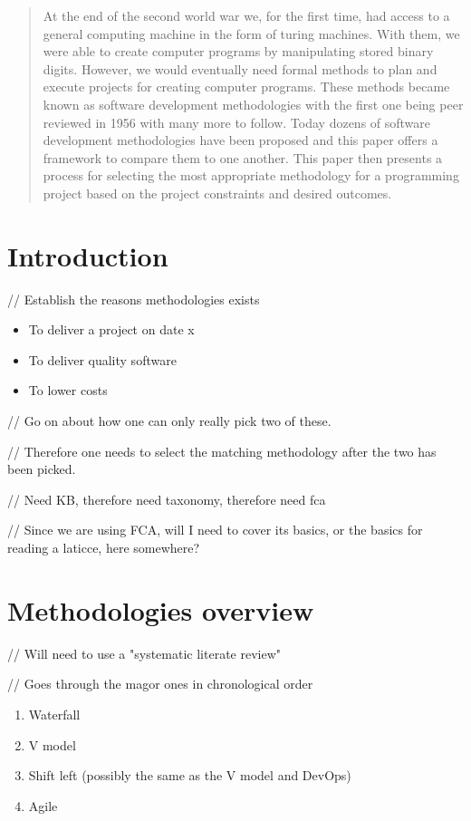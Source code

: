 \begin{abstract}
  At the end of the second world war we, for the first time, had access to a general computing machine in the form of turing machines.
  With them, we were able to create computer programs by manipulating stored binary digits.
  However, we would eventually need formal methods to plan and execute projects for creating computer programs.
  These methods became known as software development methodologies with the first one being peer reviewed in 1956 with many more to follow.
  Today dozens of software development methodologies have been proposed and this paper offers a framework to compare them to one another.
  This paper then presents a process for selecting the most appropriate methodology for a programming project based on the project constraints and desired outcomes.
\end{abstract}

\section{Introduction}
// Establish the reasons methodologies exists
\cite{einstein_1905}

\begin{itemize}
    \item To deliver a project on date x
    \item To deliver quality software
    \item To lower costs
\end{itemize}

// Go on about how one can only really pick two of these.

// Therefore one needs to select the matching methodology after the two has been picked.

// Need KB, therefore need taxonomy, therefore need fca

// Since we are using FCA, will I need to cover its basics, or the basics for reading a laticce, here somewhere?

\section{Methodologies overview}
// Will need to use a "systematic literate review"

// Goes through the magor ones in chronological order

\begin{enumerate}
  \item Waterfall
  \item V model
  \item Shift left (possibly the same as the V model and DevOps)
  \item Agile
\end{enumerate}

